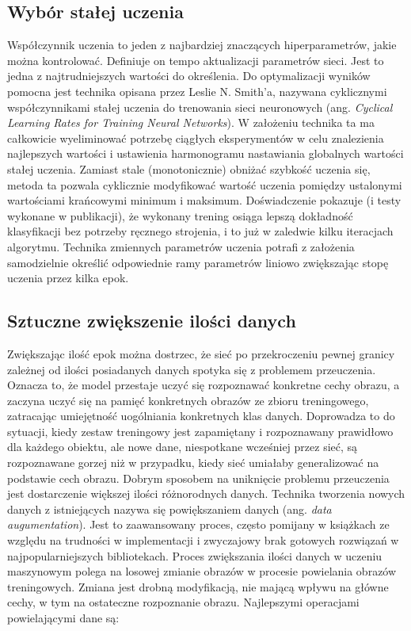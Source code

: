 \documentclass[12pt,a4paper,twoside,titlepage,openright]{book}
\begin{document}
\subsection{Wybór stałej uczenia}
Współczynnik uczenia to jeden z najbardziej znaczących hiperparametrów, jakie można kontrolować. Definiuje on tempo aktualizacji parametrów sieci. Jest to jedna z najtrudniejszych wartości do określenia. Do optymalizacji wyników pomocna jest technika opisana przez Leslie N. Smith’a, nazywana cyklicznymi współczynnikami stałej uczenia do trenowania sieci neuronowych (ang. \textit{Cyclical Learning Rates for Training Neural Networks}). W założeniu technika ta ma całkowicie wyeliminować potrzebę ciągłych eksperymentów w celu znalezienia najlepszych wartości i ustawienia harmonogramu nastawiania globalnych wartości stałej uczenia. Zamiast stale (monotonicznie) obniżać szybkość uczenia się, metoda ta pozwala cyklicznie modyfikować wartość uczenia pomiędzy ustalonymi wartościami krańcowymi minimum i maksimum. Doświadczenie pokazuje (i testy wykonane w publikacji), że wykonany trening osiąga lepszą dokładność klasyfikacji bez potrzeby ręcznego strojenia, i to już w zaledwie kilku iteracjach algorytmu. Technika zmiennych parametrów uczenia potrafi z założenia samodzielnie określić odpowiednie ramy parametrów liniowo zwiększając stopę uczenia przez kilka epok. \cite{DBLP:journals/corr/Smith15a}

\subsection{Sztuczne zwiększenie ilości danych}
Zwiększając ilość epok można dostrzec, że sieć po przekroczeniu pewnej granicy zależnej od ilości posiadanych danych spotyka się z problemem przeuczenia. Oznacza to, że model przestaje uczyć się rozpoznawać konkretne cechy obrazu, a zaczyna uczyć się na pamięć konkretnych obrazów ze zbioru treningowego, zatracając umiejętność uogólniania konkretnych klas danych. Doprowadza to do sytuacji, kiedy zestaw treningowy jest zapamiętany i rozpoznawany prawidłowo dla każdego obiektu, ale nowe dane, niespotkane wcześniej przez sieć, są rozpoznawane gorzej niż w przypadku, kiedy sieć umiałaby generalizować na podstawie cech obrazu.
Dobrym sposobem na uniknięcie problemu przeuczenia jest dostarczenie większej ilości różnorodnych danych. Technika tworzenia nowych danych z istniejących nazywa się powiększaniem danych (ang. \textit{data augumentation}). Jest to zaawansowany proces, często pomijany w książkach ze względu na trudności w implementacji i zwyczajowy brak gotowych rozwiązań w najpopularniejszych bibliotekach. 
Proces zwiększania ilości danych w uczeniu maszynowym polega na losowej zmianie obrazów w procesie powielania obrazów treningowych. Zmiana jest drobną modyfikacją, nie mającą wpływu na główne cechy, w tym na ostateczne rozpoznanie obrazu. Najlepszymi operacjami powielającymi dane są:
\end{document}
